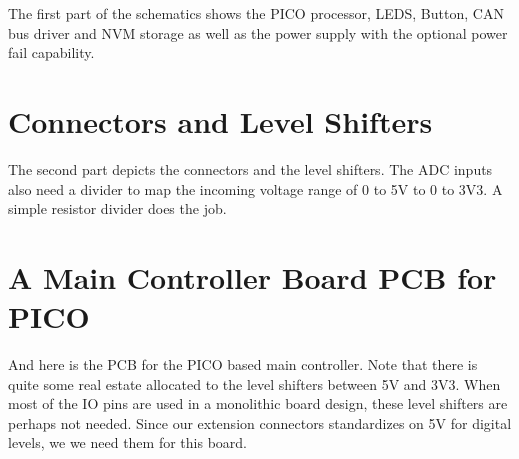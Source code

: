The first part of the schematics shows the PICO processor, LEDS, Button, CAN bus driver and NVM storage as well as the power supply with the optional power fail capability.


\section{Connectors and Level Shifters}

The second part depicts the connectors and the level shifters. The ADC inputs also need a divider to map the incoming voltage range of 0 to 5V to 0 to 3V3. A simple resistor divider does the job.


\section{A Main Controller Board PCB for PICO}

And here is the PCB for the PICO based main controller. Note that there is quite some real estate allocated to the level shifters between 5V and 3V3. When most of the IO pins are used in a monolithic board design, these level shifters are perhaps not needed. Since our extension connectors standardizes on 5V for digital levels, we we need them for this board.


\section{\Summary}

